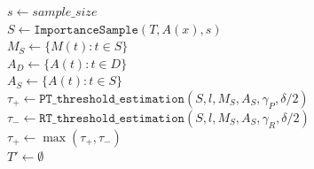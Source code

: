 
\begin{footnotesize}



\begin{algorithm}[t!] %
\caption{SEM-FILTER($T$, $l$, $M(x)$, $A(x)$, $\gamma_R$, $\gamma_P$, $\delta$)}
\label{alg:approx_sem_filter}


$s \gets \textit{sample\_size}$\\ 
$S \gets \texttt{ImportanceSample}(T, A(x), s)$\\
$M_S \gets \{M(t) : t \in S\}$\\
$A_D \gets \{A(t) : t \in D\}$\\
$A_S \gets \{A(t) : t \in S\}$\\
$\tau_+ \gets \texttt{PT\_threshold\_estimation}(S, l, M_S, A_S, \gamma_P, \delta / 2)$\\
$\tau_- \gets \texttt{RT\_threshold\_estimation}(S, l, M_S, A_S, \gamma_R, \delta / 2)$\\
$\tau_+ \gets \max(\tau_+, \tau_-)$\\
$T' \gets \emptyset$\\


\end{algorithm}
\end{footnotesize}
